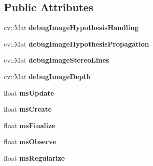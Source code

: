\subsection*{Public Attributes}
\begin{DoxyCompactItemize}
\item 
\hypertarget{classlsd__slam_1_1_depth_map_af1a62216054ed2b6b349582e1c072724}{cv\-::\-Mat {\bfseries debug\-Image\-Hypothesis\-Handling}}\label{classlsd__slam_1_1_depth_map_af1a62216054ed2b6b349582e1c072724}

\item 
\hypertarget{classlsd__slam_1_1_depth_map_af4b1dbbafb28400c67581b32f39e3c65}{cv\-::\-Mat {\bfseries debug\-Image\-Hypothesis\-Propagation}}\label{classlsd__slam_1_1_depth_map_af4b1dbbafb28400c67581b32f39e3c65}

\item 
\hypertarget{classlsd__slam_1_1_depth_map_abc457d3baf8123e4d2f4e29362d7ab24}{cv\-::\-Mat {\bfseries debug\-Image\-Stereo\-Lines}}\label{classlsd__slam_1_1_depth_map_abc457d3baf8123e4d2f4e29362d7ab24}

\item 
\hypertarget{classlsd__slam_1_1_depth_map_a637cbf76ea7e04193cc20dc703d2ccc0}{cv\-::\-Mat {\bfseries debug\-Image\-Depth}}\label{classlsd__slam_1_1_depth_map_a637cbf76ea7e04193cc20dc703d2ccc0}

\item 
\hypertarget{classlsd__slam_1_1_depth_map_a0293920188f70a06ec1e53f6f127ff12}{float {\bfseries ms\-Update}}\label{classlsd__slam_1_1_depth_map_a0293920188f70a06ec1e53f6f127ff12}

\item 
\hypertarget{classlsd__slam_1_1_depth_map_ad639f2fda59ef3ceeb6604853968efd3}{float {\bfseries ms\-Create}}\label{classlsd__slam_1_1_depth_map_ad639f2fda59ef3ceeb6604853968efd3}

\item 
\hypertarget{classlsd__slam_1_1_depth_map_ab185dd9f3fc27093ecf093926c4a6a5e}{float {\bfseries ms\-Finalize}}\label{classlsd__slam_1_1_depth_map_ab185dd9f3fc27093ecf093926c4a6a5e}

\item 
\hypertarget{classlsd__slam_1_1_depth_map_a8078cd87bf8b167bd24216291bc0b340}{float {\bfseries ms\-Observe}}\label{classlsd__slam_1_1_depth_map_a8078cd87bf8b167bd24216291bc0b340}

\item 
\hypertarget{classlsd__slam_1_1_depth_map_abc57c33900e6522b380d2637708e9e1f}{float {\bfseries ms\-Regularize}}\label{classlsd__slam_1_1_depth_map_abc57c33900e6522b380d2637708e9e1f}


\end{DoxyCompactItemize}
